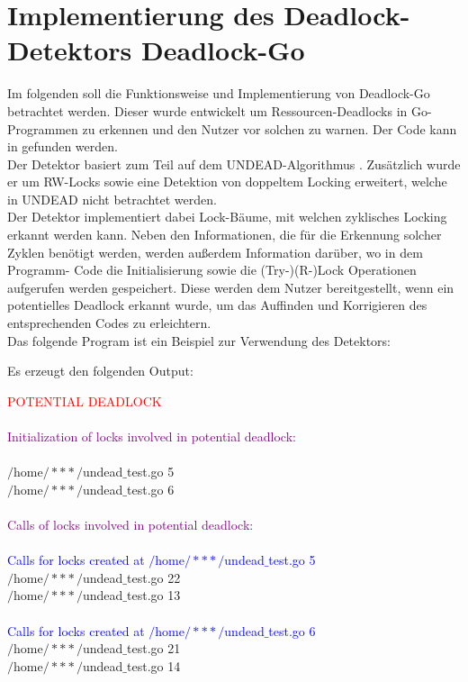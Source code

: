 \chapter{Implementierung des Deadlock-Detektors \glqq Deadlock-Go \grqq}
Im folgenden soll die Funktionsweise und Implementierung von Deadlock-Go 
betrachtet werden. Dieser wurde entwickelt um Ressourcen-Deadlocks in Go-Programmen
zu erkennen und den Nutzer vor solchen zu warnen. Der Code kann in 
\cite{implementation} gefunden werden.\\
Der Detektor basiert zum Teil auf dem UNDEAD-Algorithmus \cite{zhou}. 
Zusätzlich wurde er um RW-Locks sowie eine Detektion von doppeltem Locking 
erweitert, welche in UNDEAD nicht betrachtet werden.\\
Der Detektor implementiert dabei Lock-Bäume, mit welchen zyklisches Locking 
erkannt werden kann. Neben den Informationen, die für die Erkennung solcher 
Zyklen benötigt werden, werden außerdem Information darüber, wo in dem Programm-
Code die Initialisierung sowie die (Try-)(R-)Lock Operationen aufgerufen werden 
gespeichert. Diese werden dem Nutzer bereitgestellt, wenn ein potentielles 
Deadlock erkannt wurde, um das Auffinden und Korrigieren des entsprechenden Codes
zu erleichtern.\\
Das folgende Program ist ein Beispiel zur Verwendung des Detektors:
\begin{figure}[H]
  
\end{figure}
\newpage
Es erzeugt den folgenden Output:

\begin{mdframed}[leftmargin=10pt,rightmargin=10pt]
\textcolor{red}{POTENTIAL DEADLOCK}\\\\
\textcolor{purple}{Initialization of locks involved in potential deadlock:}\\\\
$/$home$/***/$undead$\_$test.go 5\\
$/$home$/***/$undead$\_$test.go 6\\\\
\textcolor{purple}{Calls of locks involved in potential deadlock:}\\\\
\textcolor{blue}{Calls for locks created at $/$home$/***/$undead$\_$test.go 5}\\
$/$home$/***/$undead$\_$test.go 22\\
$/$home$/***/$undead$\_$test.go 13\\\\
\textcolor{blue}{Calls for locks created at $/$home$/***/$undead$\_$test.go 6}\\
$/$home$/***/$undead$\_$test.go 21\\
$/$home$/***/$undead$\_$test.go 14\
\end{mdframed}

